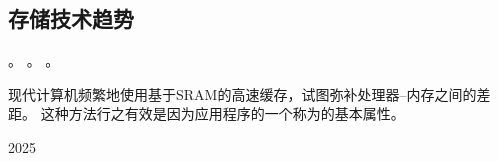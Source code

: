 {    \subsection{存储技术趋势}
    {
        。
        。
        。

        现代计算机频繁地使用基于SRAM的高速缓存，试图弥补处理器--内存之间的差距。
        这种方法行之有效是因为应用程序的一个称为的基本属性。

        \begin{practicec}
            2025
        \end{practicec}
    }
}
